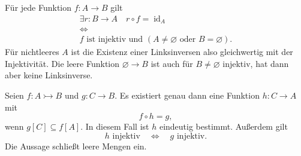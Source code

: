 \begin{theorem}
\label{b06guide:thm:leftinverse}
Für jede Funktion $f\colon A\to B$ gilt
\[
 \begin{gathered}
 \exists r\colon B\to A\quad
          r\circ f=\operatorname{id}_A\\
 \Longleftrightarrow\\
 f\text{ ist injektiv und }(A\ne\varnothing\text{ oder }B=\varnothing).
 \end{gathered}
\]
Für nichtleeres $A$ ist die Existenz einer Linksinversen also
gleichwertig mit der Injektivität. Die leere Funktion
$\varnothing\to B$ ist auch für $B\ne\varnothing$ injektiv,
hat dann aber keine Linksinverse.
\end{theorem}

\begin{theorem}
\label{b06guide:thm:factorization}
Seien $f\colon A\rightarrowtail B$ und $g\colon C\to B$.
Es existiert genau dann eine Funktion $h\colon C\to A$ mit
\[
 f\circ h=g,
\]
wenn $g[C]\subseteq f[A]$. In diesem Fall ist $h$ eindeutig
bestimmt. Außerdem gilt
\[
 h\text{ injektiv}\quad\Longleftrightarrow\quad g\text{ injektiv}.
\]
Die Aussage schließt leere Mengen ein.
\end{theorem}